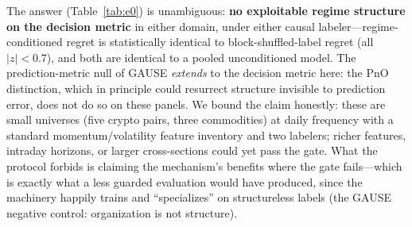 \documentclass{article}
\begin{document}
The answer (Table~\ref{tab:e0}) is unambiguous: \textbf{no exploitable
regime structure on the decision metric} in either domain, under either
causal labeler---regime-conditioned regret is statistically identical to
block-shuffled-label regret (all $|z| < 0.7$), and both are identical to a
pooled unconditioned model. The prediction-metric null of GAUSE
\emph{extends} to the decision metric here: the PnO distinction, which in
principle could resurrect structure invisible to prediction error, does
not do so on these panels. We bound the claim honestly: these are small
universes (five crypto pairs, three commodities) at daily frequency with a
standard momentum/volatility feature inventory and two labelers; richer
features, intraday horizons, or larger cross-sections could yet pass the
gate. What the protocol forbids is claiming the mechanism's benefits where
the gate fails---which is exactly what a less guarded evaluation would
have produced, since the machinery happily trains and ``specializes''
on structureless labels (the GAUSE negative control: organization is not
structure).
\end{document}
